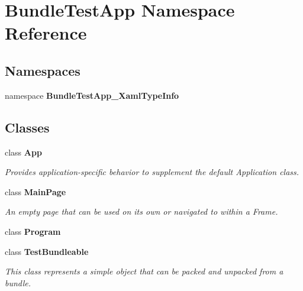 \section{Bundle\+Test\+App Namespace Reference}
\label{namespace_bundle_test_app}
\subsection*{Namespaces}
\begin{DoxyCompactItemize}
\item 
namespace {\bf Bundle\+Test\+App\+\_\+\+Xaml\+Type\+Info}
\end{DoxyCompactItemize}
\subsection*{Classes}
\begin{DoxyCompactItemize}
\item 
class {\bf App}
\begin{DoxyCompactList}\small\item\em Provides application-\/specific behavior to supplement the default Application class. \end{DoxyCompactList}\item 
class {\bf Main\+Page}
\begin{DoxyCompactList}\small\item\em An empty page that can be used on its own or navigated to within a Frame. \end{DoxyCompactList}\item 
class {\bfseries Program}
\item 
class {\bf Test\+Bundleable}
\begin{DoxyCompactList}\small\item\em This class represents a simple object that can be packed and unpacked from a bundle. \end{DoxyCompactList}\end{DoxyCompactItemize}
